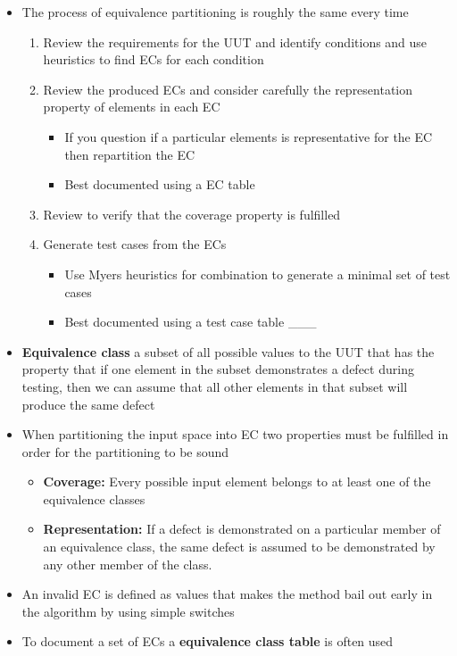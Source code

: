 \documentclass[11pt]{article}
\providecommand{\tightlist}{%
      \setlength{\itemsep}{0pt}\setlength{\parskip}{0pt}}
\begin{document}
\begin{itemize}
\item
  The process of equivalence partitioning is roughly the same every time

  \begin{enumerate}
  \def\labelenumi{\arabic{enumi}.}
  \tightlist
  \item
    Review the requirements for the UUT and identify conditions and use
    heuristics to find ECs for each condition
  \item
    Review the produced ECs and consider carefully the representation
    property of elements in each EC

    \begin{itemize}
    \tightlist
    \item
      If you question if a particular elements is representative for the
      EC then repartition the EC
    \item
      Best documented using a EC table
    \end{itemize}
  \item
    Review to verify that the coverage property is fulfilled
  \item
    Generate test cases from the ECs

    \begin{itemize}
    \tightlist
    \item
      Use Myers heuristics for combination to generate a minimal set of
      test cases\\
    \item
      Best documented using a test case table \_\_\_
    \end{itemize}
  \end{enumerate}
\item
  \textbf{Equivalence class} a subset of all possible values to the UUT
  that has the property that if one element in the subset demonstrates a
  defect during testing, then we can assume that all other elements in
  that subset will produce the same defect
\item
  When partitioning the input space into EC two properties must be
  fulfilled in order for the partitioning to be sound

  \begin{itemize}
  \tightlist
  \item
    \textbf{Coverage:} Every possible input element belongs to at least
    one of the equivalence classes
  \item
    \textbf{Representation:} If a defect is demonstrated on a particular
    member of an equivalence class, the same defect is assumed to be
    demonstrated by any other member of the class.
  \end{itemize}
\item
  An invalid EC is defined as values that makes the method bail out
  early in the algorithm by using simple switches
\item
  To document a set of ECs a \textbf{equivalence class table} is often
  used


\end{itemize}
\end{document}
